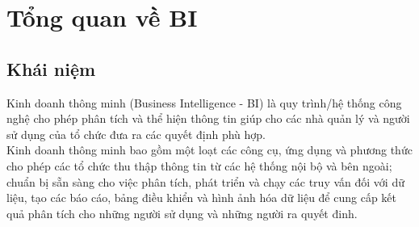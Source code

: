 \section{Tổng quan về BI}
\subsection{Khái niệm}
Kinh doanh thông minh (Business Intelligence - BI) là quy trình/hệ thống công nghệ cho phép phân tích và thể hiện thông tin giúp cho các nhà quản lý và người sử dụng của tổ chức đưa ra các quyết định phù hợp.\\
Kinh doanh thông minh bao gồm một loạt các công cụ, ứng dụng và phương thức cho phép các tổ chức thu thập thông tin từ các hệ thống nội bộ và bên ngoài; chuẩn bị sẵn sàng cho việc phân tích, phát triển và chạy các truy vấn đối với dữ liệu, tạo các báo cáo, bảng điều khiển và hình ảnh hóa dữ liệu để cung cấp kết quả phân tích cho những người sử dụng và những người ra quyết đinh.
